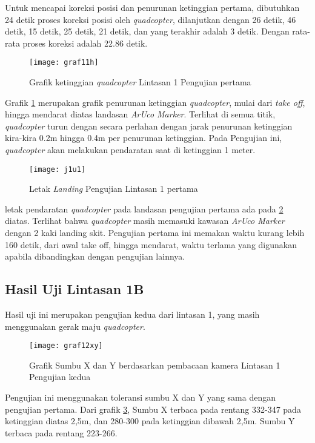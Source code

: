 Untuk mencapai koreksi posisi dan penurunan ketinggian pertama, dibutuhkan 24 detik proses koreksi posisi oleh \textit{quadcopter}, dilanjutkan dengan 26 detik, 46 detik, 15 detik, 25 detik, 21 detik, dan yang terakhir adalah 3 detik. Dengan rata-rata proses koreksi adalah 22.86 detik.

\begin{figure}[H]
	\centering
	\texttt{[image: graf11h]}
	\caption{Grafik ketinggian \textit{quadcopter} Lintasan 1 Pengujian pertama}
	\label{fig:graf11h}
\end{figure}

Grafik \cref{fig:graf11h} merupakan grafik penurunan ketinggian \textit{quadcopter}, mulai dari \textit{take off}, hingga mendarat diatas landasan \textit{ArUco Marker}. Terlihat di semua titik, \textit{quadcopter} turun dengan secara perlahan dengan jarak penurunan ketinggian kira-kira 0.2m hingga 0.4m per penurunan ketinggian.
Pada Pengujian ini, \textit{quadcopter} akan melakukan pendaratan saat di ketinggian 1 meter.\\

\begin{figure}[H]
	\centering
	\texttt{[image: j1u1]}
	\caption{Letak \textit{Landing} Pengujian Lintasan 1 pertama}
	\label{fig:j1u1}
\end{figure}

letak pendaratan \textit{quadcopter} pada landasan pengujian pertama ada pada \cref{fig:j1u1} diatas. Terlihat bahwa \textit{quadcopter} masih memasuki kawasan \textit{ArUco Marker} dengan 2 kaki landing skit.
Pengujian pertama ini memakan waktu kurang lebih 160 detik, dari awal take off, hingga mendarat, waktu terlama yang digunakan apabila dibandingkan dengan pengujian lainnya.

\subsection{Hasil Uji Lintasan 1B}
Hasil uji ini merupakan pengujian kedua dari lintasan 1, yang masih menggunakan gerak maju \textit{quadcopter}.

\begin{figure}[H]
	\centering
	\texttt{[image: graf12xy]}
	\caption{Grafik Sumbu X dan Y berdasarkan pembacaan kamera Lintasan 1 Pengujian kedua}
	\label{fig:graf12xy}
\end{figure}

Pengujian ini menggunakan toleransi sumbu X dan Y yang sama dengan pengujian pertama. Dari grafik \cref{fig:graf12xy}, Sumbu X terbaca pada rentang 332-347 pada ketinggian diatas 2,5m, dan 280-300 pada ketinggian dibawah 2,5m. Sumbu Y terbaca pada rentang 223-266.

